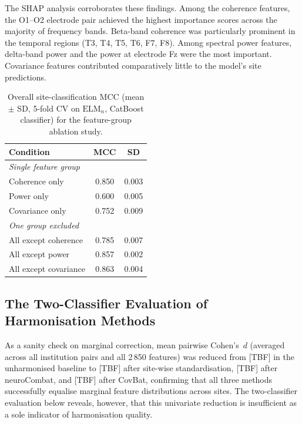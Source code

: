 \documentclass[preprint,12pt]{elsarticle}
\begin{document}
The SHAP analysis corroborates these findings.
Among the coherence features, the O1--O2 electrode pair achieved the
highest importance scores across the majority of frequency bands.
Beta-band coherence was particularly prominent in the temporal regions
(T3, T4, T5, T6, F7, F8).
Among spectral power features, delta-band power and the power at
electrode Fz were the most important.
Covariance features contributed comparatively little to the model's
site predictions.

\begin{table}[htbp]
  \centering
  \caption{Overall site-classification MCC (mean $\pm$ SD, 5-fold CV
    on $\mathrm{ELM}_n$, CatBoost classifier) for the feature-group
    ablation study.}
  \label{tab:ablation}
  \begin{tabular}{lcc}
    \toprule
    \textbf{Condition} & \textbf{MCC} & \textbf{SD} \\
    \midrule
    \multicolumn{3}{l}{\textit{Single feature group}} \\
    \quad Coherence only  & 0.850 & 0.003 \\
    \quad Power only      & 0.600 & 0.005 \\
    \quad Covariance only & 0.752 & 0.009 \\
    \midrule
    \multicolumn{3}{l}{\textit{One group excluded}} \\
    \quad All except coherence  & 0.785 & 0.007 \\
    \quad All except power      & 0.857 & 0.002 \\
    \quad All except covariance & 0.863 & 0.004 \\
    \bottomrule
  \end{tabular}
\end{table}


\subsection{The Two-Classifier Evaluation of Harmonisation Methods}
\label{subsec:harmonisation_results}

As a sanity check on marginal correction, mean pairwise Cohen's~$d$
(averaged across all institution pairs and all 2\,850 features)
was reduced from [TBF] in the unharmonised baseline to [TBF]
after site-wise standardisation, [TBF] after \mbox{neuroCombat},
and [TBF] after \mbox{CovBat}, confirming that all three methods
successfully equalise marginal feature distributions across sites.
The two-classifier evaluation below reveals, however, that this
univariate reduction is insufficient as a sole indicator of
harmonisation quality.
\end{document}
